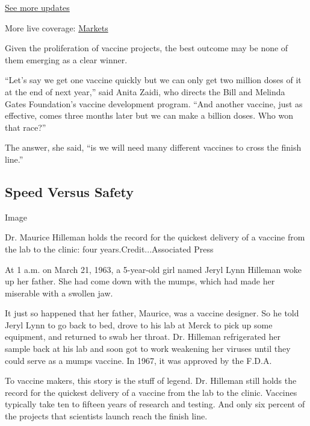\href{https://www.nytimes3xbfgragh.onion/2020/09/08/world/covid-19-coronavirus.html?action=click\&pgtype=Article\&state=default\&region=MAIN_CONTENT_1\&context=storylines_live_updates}{See
more updates}

More live coverage:
\href{https://www.nytimes3xbfgragh.onion/live/2020/09/08/business/stock-market-today-coronavirus?action=click\&pgtype=Article\&state=default\&region=MAIN_CONTENT_1\&context=storylines_live_updates}{Markets}

Given the proliferation of vaccine projects, the best outcome may be
none of them emerging as a clear winner.

``Let's say we get one vaccine quickly but we can only get two million
doses of it at the end of next year,'' said Anita Zaidi, who directs the
Bill and Melinda Gates Foundation's vaccine development program. ``And
another vaccine, just as effective, comes three months later but we can
make a billion doses. Who won that race?''

The answer, she said, ``is we will need many different vaccines to cross
the finish line.''

\hypertarget{speed-versus-safety}{%
\subsection{Speed Versus Safety}\label{speed-versus-safety}}

Image

Dr. Maurice Hilleman holds the record for the quickest delivery of a
vaccine from the lab to the clinic: four years.Credit...Associated Press

At 1 a.m. on March 21, 1963, a 5-year-old girl named Jeryl Lynn Hilleman
woke up her father. She had come down with the mumps, which had made her
miserable with a swollen jaw.

It just so happened that her father, Maurice, was a vaccine designer. So
he told Jeryl Lynn to go back to bed, drove to his lab at Merck to pick
up some equipment, and returned to swab her throat. Dr. Hilleman
refrigerated her sample back at his lab and soon got to work weakening
her viruses until they could serve as a mumps vaccine. In 1967, it was
approved by the F.D.A.

To vaccine makers, this story is the stuff of legend. Dr. Hilleman still
holds the record for the quickest delivery of a vaccine from the lab to
the clinic. Vaccines typically take ten to fifteen years of research and
testing. And only six percent of the projects that scientists launch
reach the finish line.

